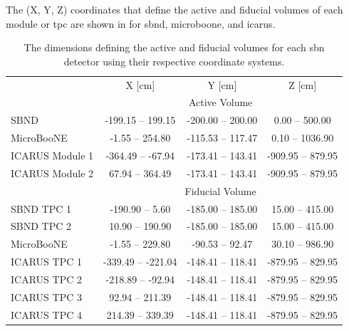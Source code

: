 The (X, Y, Z) coordinates that define the active and fiducial volumes of each module or \gls{tpc} are shown in  for \gls{sbnd}, \gls{microboone}, and \gls{icarus}.

\begin{table}[h!]
\begin{tabular}{lccc}
 & \multicolumn{1}{c}{X [cm]} & \multicolumn{1}{c}{Y [cm]} & \multicolumn{1}{c}{Z [cm]} \\ \cline{2-4} 
 & \multicolumn{3}{c}{Active Volume} \\ \cline{2-4} 
SBND & -199.15 -- \phantom{-}199.15 & -200.00 -- 200.00 & \phantom{-00}0.00 -- \phantom{0}500.00 \\
MicroBooNE & \phantom{00}-1.55 -- \phantom{-}254.80 & -115.53 -- 117.47 & \phantom{-00}0.10 -- 1036.90 \\
ICARUS Module 1 & -364.49 -- \phantom{0}-67.94 & -173.41 -- 143.41 & -909.95 -- \phantom{0}879.95 \\
ICARUS Module 2 & \phantom{-0}67.94 -- \phantom{-}364.49 & -173.41 -- 143.41 & -909.95 -- \phantom{0}879.95 \\ \cline{2-4} 
 & \multicolumn{3}{c}{Fiducial Volume} \\ \cline{2-4} 
SBND TPC 1 & -190.90 -- \phantom{-00}5.60 & -185.00 -- 185.00 & \phantom{-0}15.00 -- 415.00 \\
SBND TPC 2 & \phantom{-0}10.90 -- \phantom{-}190.90 & -185.00 -- 185.00 & \phantom{-0}15.00 -- 415.00 \\
MicroBooNE & \phantom{00}-1.55 -- \phantom{-}229.80 & \phantom{0}-90.53 -- \phantom{0}92.47 & \phantom{-0}30.10 -- 986.90 \\
ICARUS TPC 1 & -339.49 -- -221.04 & -148.41 -- 118.41 & -879.95 -- 829.95 \\
ICARUS TPC 2 & -218.89 -- \phantom{0}-92.94 & -148.41 -- 118.41 & -879.95 -- 829.95 \\
ICARUS TPC 3 & \phantom{-0}92.94 -- \phantom{-}211.39 & -148.41 -- 118.41 & -879.95 -- 829.95 \\
ICARUS TPC 4 & \phantom{-}214.39 -- \phantom{-}339.39 & -148.41 -- 118.41 & -879.95 -- 829.95
\end{tabular}
\caption[The active and fiducial volumes of the \gls{sbn} detectors.]{The dimensions defining the active and fiducial volumes for each \gls{sbn} detector using their respective coordinate systems.} \label{table:active_and_fiducial_volumes}
\end{table}

